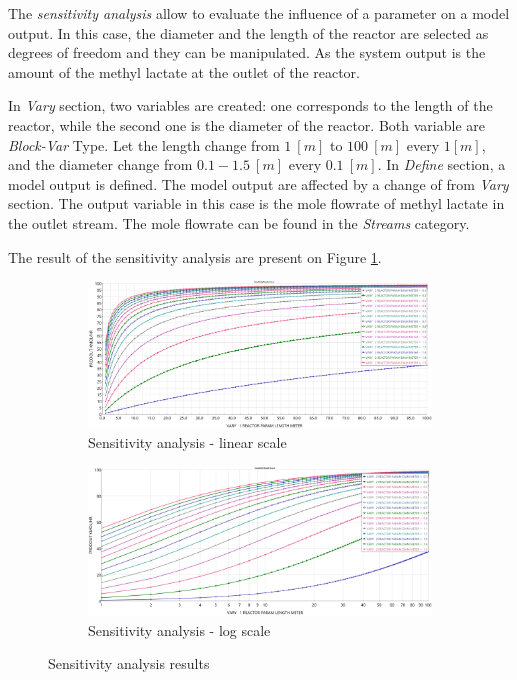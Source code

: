 The \textit{sensitivity analysis} allow to evaluate the influence of a parameter on a model output. In this case, the diameter and the length of the reactor are selected as degrees of freedom and they can be manipulated. As the system output is the amount of the methyl lactate at the outlet of the reactor.

In \textit{Vary} section, two variables are created: one corresponds to the length of the reactor, while the second one is the diameter of the reactor. Both variable are \textit{Block-Var} Type. Let the length change from $1~[m]$ to $100~[m]$ every $1[m]$, and the diameter change from $0.1-1.5~[m]$ every $0.1~[m]$.
In \textit{Define} section, a model output is defined. The model output are affected by a change of from \textit{Vary} section. The output variable in this case is the mole flowrate of methyl lactate in the outlet stream. The mole flowrate can be found in the \textit{Streams} category.

The result of the sensitivity analysis are present on Figure \ref{fig:Ester_Sensitivity_Analysis}.

\begin{figure}[h!]
	\centering
	\begin{subfigure}[b]{0.99\textwidth}
		\centering
		\includegraphics[width=\textwidth]{Figures/Proces_Analysis/Parametric_sensitivity_analysis.jpg}
		\caption{Sensitivity analysis - linear scale}
	\end{subfigure}
	\begin{subfigure}[b]{0.99\textwidth}
		\centering
		\includegraphics[width=\textwidth]{Figures/Proces_Analysis/Parametric_sensitivity_analysis_inverse.jpg}
		\caption{Sensitivity analysis - log scale}
	\end{subfigure}
	\caption{Sensitivity analysis results}
	\label{fig:Ester_Sensitivity_Analysis}
\end{figure}

